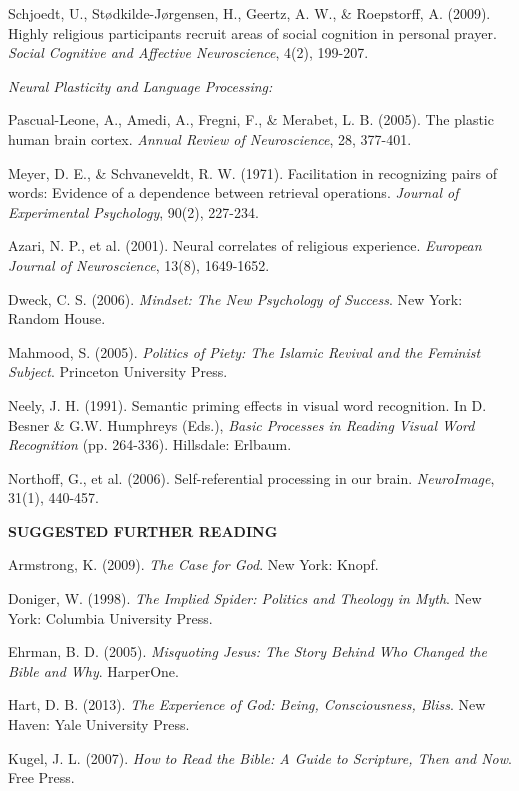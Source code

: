 \documentclass[12pt,twoside]{book}
\begin{document}
Schjoedt, U., Stødkilde-Jørgensen, H., Geertz, A. W., \& Roepstorff, A. (2009). Highly religious participants recruit areas of social cognition in personal prayer. \emph{Social Cognitive and Affective Neuroscience}, 4(2), 199-207.

\emph{Neural Plasticity and Language Processing:}

Pascual-Leone, A., Amedi, A., Fregni, F., \& Merabet, L. B. (2005). The plastic human brain cortex. \emph{Annual Review of Neuroscience}, 28, 377-401.

Meyer, D. E., \& Schvaneveldt, R. W. (1971). Facilitation in recognizing pairs of words: Evidence of a dependence between retrieval operations. \emph{Journal of Experimental Psychology}, 90(2), 227-234.

Azari, N. P., et al. (2001). Neural correlates of religious experience. \emph{European Journal of Neuroscience}, 13(8), 1649-1652.

Dweck, C. S. (2006). \emph{Mindset: The New Psychology of Success}. New York: Random House.

Mahmood, S. (2005). \emph{Politics of Piety: The Islamic Revival and the Feminist Subject}. Princeton University Press.

Neely, J. H. (1991). Semantic priming effects in visual word recognition. In D. Besner \& G.W. Humphreys (Eds.), \emph{Basic Processes in Reading Visual Word Recognition} (pp. 264-336). Hillsdale: Erlbaum.

Northoff, G., et al. (2006). Self-referential processing in our brain. \emph{NeuroImage}, 31(1), 440-457.

\vspace{0.5cm}

\textbf{\textbf{SUGGESTED FURTHER READING}}

\vspace{0.1cm}

Armstrong, K. (2009). \emph{The Case for God}. New York: Knopf.

Doniger, W. (1998). \emph{The Implied Spider: Politics and Theology in Myth}. New York: Columbia University Press.

Ehrman, B. D. (2005). \emph{Misquoting Jesus: The Story Behind Who Changed the Bible and Why}. HarperOne.

Hart, D. B. (2013). \emph{The Experience of God: Being, Consciousness, Bliss}. New Haven: Yale University Press.

Kugel, J. L. (2007). \emph{How to Read the Bible: A Guide to Scripture, Then and Now}. Free Press.
\end{document}
